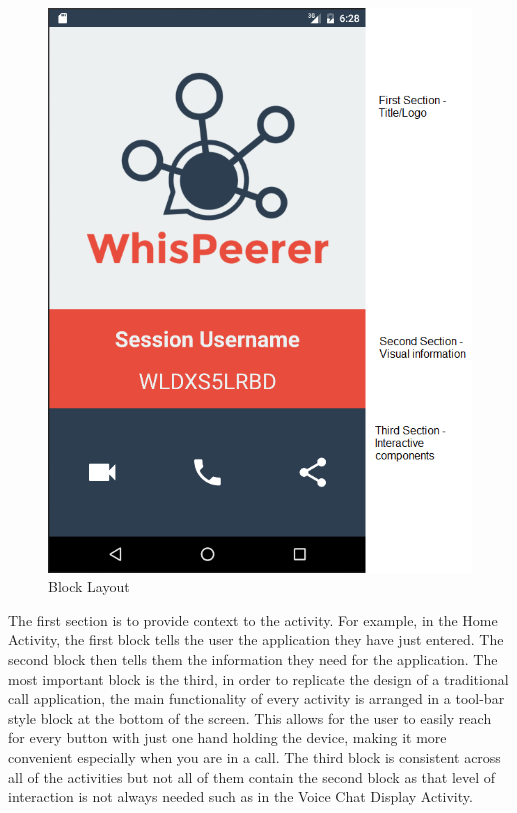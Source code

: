 \documentclass[]{report}
\begin{document}
		\begin{figure}[H]
			\caption{Block Layout}
			\centering
			\includegraphics[scale=0.35]{blocks.png}
		\end{figure}
		
		The first section is to provide context to the activity. For example, in the Home Activity, the first block tells the user the application they have just entered. The second block then tells them the information they need for the application. The most important block is the third, in order to replicate the design of a traditional call application, the main functionality of every activity is arranged in a tool-bar style block at the bottom of the screen. This allows for the user to easily reach for every button with just one hand holding the device, making it more convenient especially when you are in a call. The third block is consistent across all of the activities but not all of them contain the second block as that level of interaction is not always needed such as in the Voice Chat Display Activity.
\end{document}
